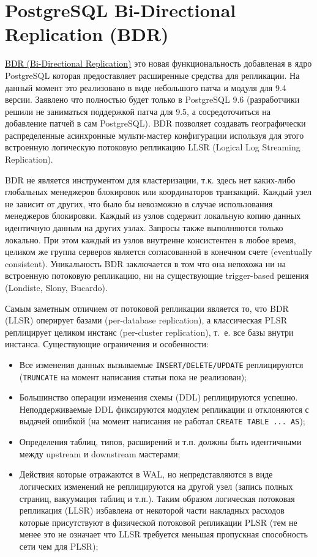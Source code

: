 \section{PostgreSQL Bi-Directional Replication (BDR)}
\label{sec:bdr}

\href{https://2ndquadrant.com/en/resources/bdr/}{BDR (Bi-Directional Replication)} это новая функциональность добавленая в ядро PostgreSQL которая предоставляет расширенные средства для репликации. На данный момент это реализовано в виде небольшого патча и модуля для 9.4 версии. Заявлено что полностью будет только в PostgreSQL 9.6 (разработчики решили не заниматься поддержкой патча для 9.5, а сосредоточиться на добавление патчей в сам PostgreSQL). BDR позволяет создавать географически распределенные асинхронные мульти-мастер конфигурации используя для этого встроенную логическую потоковую репликацию LLSR (Logical Log Streaming Replication).

BDR не является инструментом для кластеризации, т.к. здесь нет каких-либо глобальных менеджеров блокировок или координаторов транзакций. Каждый узел не зависит от других, что было бы невозможно в случае использования менеджеров блокировки. Каждый из узлов содержит локальную копию данных идентичную данным на других узлах. Запросы также выполняются только локально. При этом каждый из узлов внутренне консистентен в любое время, целиком же группа серверов является согласованной в конечном счете (eventually consistent). Уникальность BDR заключается в том что она непохожа ни на встроенную потоковую репликацию, ни на существующие trigger-based решения (Londiste, Slony, Bucardo).

Самым заметным отличием от потоковой репликации является то, что BDR (LLSR) оперирует базами (per-database replication), а классическая PLSR реплицирует целиком инстанс (per-cluster replication), т.~е. все базы внутри инстанса. Существующие ограничения и особенности:

\begin{itemize}
  \item Все изменения данных вызываемые \lstinline!INSERT/DELETE/UPDATE! реплицируются (\lstinline!TRUNCATE! на момент написания статьи пока не реализован);
  \item Большинство операции изменения схемы (DDL) реплицируются успешно. Неподдерживаемые DDL фиксируются модулем репликации и отклоняются с выдачей ошибкой (на момент написания не работал \lstinline!CREATE TABLE ... AS!);
  \item Определения таблиц, типов, расширений и т.п. должны быть идентичными между upstream и downstream мастерами;
  \item Действия которые отражаются в WAL, но непредставляются в виде логических изменений не реплицируются на другой узел (запись полных страниц, вакуумация таблиц и т.п.). Таким образом логическая потоковая репликация (LLSR) избавлена от некоторой части накладных расходов которые присутствуют в физической потоковой репликации PLSR (тем не менее это не означает что LLSR требуется меньшая пропускная способность сети чем для PLSR);
\end{itemize}

